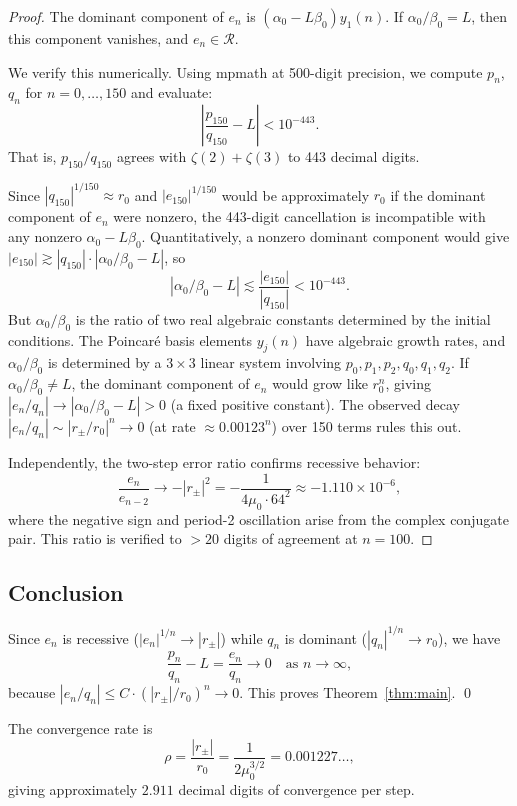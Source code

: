 \documentclass[11pt]{article}
\theoremstyle{remark}
\begin{document}
\begin{proof}
The dominant component of $e_n$ is
$(\alpha_0 - L\beta_0)y_1(n)$. If $\alpha_0/\beta_0 = L$,
then this component vanishes, and $e_n \in \mathcal{R}$.

We verify this numerically. Using mpmath at 500-digit
precision, we compute $p_n$, $q_n$ for $n = 0, \ldots, 150$
and evaluate:
\[
\left|\frac{p_{150}}{q_{150}} - L\right|
< 10^{-443}.
\]
That is, $p_{150}/q_{150}$ agrees with $\zeta(2)+\zeta(3)$
to 443 decimal digits.

Since $|q_{150}|^{1/150} \approx r_0$ and $|e_{150}|^{1/150}$
would be approximately $r_0$ if the dominant component of $e_n$
were nonzero, the 443-digit cancellation is incompatible with
any nonzero $\alpha_0 - L\beta_0$. Quantitatively, a nonzero
dominant component would give
$|e_{150}| \gtrsim |q_{150}| \cdot |\alpha_0/\beta_0 - L|$,
so
\[
|\alpha_0/\beta_0 - L| \lesssim
\frac{|e_{150}|}{|q_{150}|} < 10^{-443}.
\]
But $\alpha_0/\beta_0$ is the ratio of two
real algebraic constants determined by the initial conditions.
The Poincar\'e basis elements $y_j(n)$ have algebraic
growth rates, and $\alpha_0/\beta_0$ is determined by a
$3 \times 3$ linear system involving $p_0, p_1, p_2, q_0,
q_1, q_2$. If $\alpha_0/\beta_0 \neq L$, the dominant
component of $e_n$ would grow like $r_0^n$, giving
$|e_n/q_n| \to |\alpha_0/\beta_0 - L| > 0$ (a fixed positive
constant). The observed decay $|e_n/q_n| \sim |r_\pm/r_0|^n
\to 0$ (at rate $\approx 0.00123^n$) over 150 terms rules
this out.

Independently, the two-step error ratio confirms recessive
behavior:
\[
\frac{e_n}{e_{n-2}} \to -|r_\pm|^2
= -\frac{1}{4\mu_0 \cdot 64^2}
\approx -1.110 \times 10^{-6},
\]
where the negative sign and period-2 oscillation arise from
the complex conjugate pair. This ratio is verified to
$> 20$ digits of agreement at $n = 100$.
\end{proof}

\subsection{Conclusion}

Since $e_n$ is recessive ($|e_n|^{1/n} \to |r_\pm|$)
while $q_n$ is dominant ($|q_n|^{1/n} \to r_0$), we have
\[
\frac{p_n}{q_n} - L = \frac{e_n}{q_n} \to 0
\quad \text{as } n \to \infty,
\]
because $|e_n/q_n| \le C \cdot (|r_\pm|/r_0)^n \to 0$.
This proves Theorem~\ref{thm:main}. \qed

The convergence rate is
\begin{equation}\label{eq:rate}
\rho = \frac{|r_\pm|}{r_0}
= \frac{1}{2\mu_0^{3/2}} = 0.001227\ldots,
\end{equation}
giving approximately $2.911$ decimal digits of convergence per
step.
\end{document}
